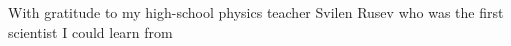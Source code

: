 \thispagestyle{empty}
{}

\vspace*{3cm}

\begin{center}
    With gratitude to my high-school physics teacher Svilen Rusev who was the
    first scientist I could learn from
\end{center}

\medskip
